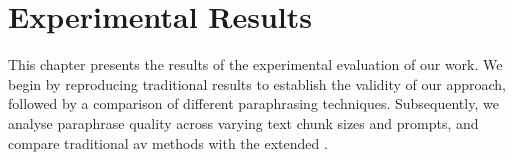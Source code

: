 \chapter{Experimental Results}
\label{chap:experimental_results}

This chapter presents the results of the experimental evaluation of our work. 
We begin by reproducing traditional results to establish the validity of our approach, followed by a comparison of different paraphrasing techniques. 
Subsequently, we analyse paraphrase quality across varying text chunk sizes and prompts, and compare traditional \ac{av} methods with the extended \impAppr{}.  










% 

% 

% 

